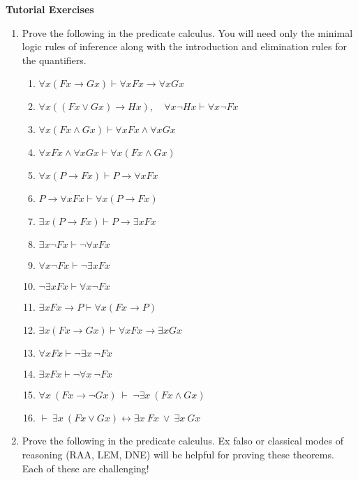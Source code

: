 \documentclass[11pt]{report}
\begin{document}
\newpage
{\bf Tutorial Exercises}
\begin{enumerate}
	
	\item Prove the following in the predicate calculus. You will need only the minimal logic rules of inference along with the introduction and elimination rules for the quantifiers.  

		\begin{enumerate}
			\item $\forall x (Fx \to Gx) \vdash  \forall x Fx \to \forall x Gx$
			\item $\forall x ((Fx \lor Gx) \to Hx),\quad \forall x \neg Hx \vdash  \forall x \neg Fx$
			\item $\forall x (Fx\land Gx) \vdash  \forall x Fx\land \forall x Gx$
			\item $  \forall x Fx\land \forall x Gx \vdash \forall x (Fx\land Gx)$
			\item $\forall x (P \to Fx) \vdash  P \to \forall x Fx$
			\item $P \to \forall x Fx \vdash \forall x (P \to Fx)$
			\item $\exists x (P \to Fx) \vdash  P \to \exists x Fx$
			\item $\exists x \neg Fx \vdash  \neg  \forall x Fx$
			\item $\forall x \neg Fx  \vdash  \neg \exists x Fx$
			\item $\neg \exists x Fx \vdash \forall x \neg Fx $
			\item $ \exists x Fx \to P \vdash \forall x (Fx \to P)$
			\item $\exists x (Fx \to Gx)  \vdash  \forall x Fx \to \exists x Gx$
			\item $\forall x Fx \vdash \lnot \exists x \ \lnot Fx$ 
			\item $\exists x Fx \vdash \lnot \forall x \ \lnot Fx$
			\item $\forall x \ (Fx \to \lnot Gx) \ \vdash \ \lnot \exists x \ (Fx \land Gx)$
			\item $\vdash \ \exists x \ (Fx \lor Gx) \leftrightarrow \exists x \ Fx \ \lor \ \exists x \ Gx$
		\end{enumerate}	

	\item Prove the following in the predicate calculus. Ex falso or classical modes of reasoning (RAA, LEM, DNE) will be helpful for proving these theorems. Each of these are challenging!


\end{enumerate}
\end{document}
